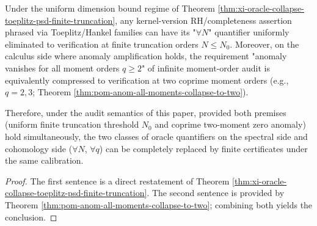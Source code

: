 \begin{corollary}\label{cor:xi-oracle-elimination-two-axes}
Under the uniform dimension bound regime of Theorem \ref{thm:xi-oracle-collapse-toeplitz-psd-finite-truncation}, any kernel-version RH/completeness assertion phrased via Toeplitz/Hankel families can have its "\(\forall N\)" quantifier uniformly eliminated to verification at finite truncation orders \(N\le N_0\).
Moreover, on the calculus side where anomaly amplification holds, the requirement "anomaly vanishes for all moment orders \(q\ge 2\)" of infinite moment-order audit is equivalently compressed to verification at two coprime moment orders (e.g., \(q=2,3\); Theorem \ref{thm:pom-anom-all-moments-collapse-to-two}).
\par
Therefore, under the audit semantics of this paper, provided both premises (uniform finite truncation threshold \(N_0\) and coprime two-moment zero anomaly) hold simultaneously, the two classes of oracle quantifiers on the spectral side and cohomology side (\(\forall N\), \(\forall q\)) can be completely replaced by finite certificates under the same calibration.
\end{corollary}
\begin{proof}
The first sentence is a direct restatement of Theorem \ref{thm:xi-oracle-collapse-toeplitz-psd-finite-truncation}.
The second sentence is provided by Theorem \ref{thm:pom-anom-all-moments-collapse-to-two}; combining both yields the conclusion.
\end{proof}

